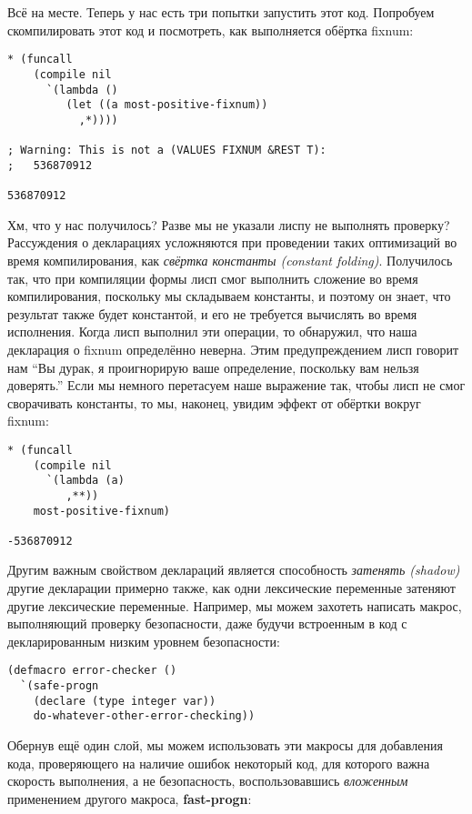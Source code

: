 Всё на месте. Теперь у нас есть три попытки запустить этот код. Попробуем скомпилировать этот код и посмотреть, как выполняется обёртка fixnum:

\begin{verbatim}
* (funcall
    (compile nil
      `(lambda ()
         (let ((a most-positive-fixnum))
           ,*))))

; Warning: This is not a (VALUES FIXNUM &REST T):
;   536870912

536870912
\end{verbatim}

Хм, что у нас получилось? Разве мы не указали лиспу не выполнять проверку? Рассуждения о декларациях усложняются при проведении таких оптимизаций во время компилирования, как \emph{свёртка константы (constant folding)}. Получилось так, что при компиляции формы лисп смог выполнить сложение во время компилирования, поскольку мы складываем константы, и поэтому он знает, что результат также будет константой, и его не требуется вычислять во время исполнения. Когда лисп выполнил эти операции, то обнаружил, что наша декларация о fixnum определённо неверна. Этим предупреждением лисп говорит нам ``Вы дурак, я проигнорирую ваше определение, поскольку вам нельзя доверять.'' Если мы немного перетасуем наше выражение так, чтобы лисп не смог сворачивать константы, то мы, наконец, увидим эффект от обёртки вокруг fixnum:

\begin{verbatim}
* (funcall
    (compile nil
      `(lambda (a)
         ,**))
    most-positive-fixnum)

-536870912
\end{verbatim}

Другим важным свойством деклараций является способность \emph{затенять (shadow)} другие декларации примерно также, как одни лексические переменные затеняют другие лексические переменные. Например, мы можем захотеть написать макрос, выполняющий проверку безопасности, даже будучи встроенным в код с декларированным низким уровнем безопасности:

\begin{verbatim}
(defmacro error-checker ()
  `(safe-progn
    (declare (type integer var))
    do-whatever-other-error-checking))
\end{verbatim}

Обернув ещё один слой, мы можем использовать эти макросы для добавления кода, проверяющего на наличие ошибок некоторый код, для которого важна скорость выполнения, а не безопасность, воспользовавшись \emph{вложенным} применением другого макроса, \textbf{fast-progn}:

